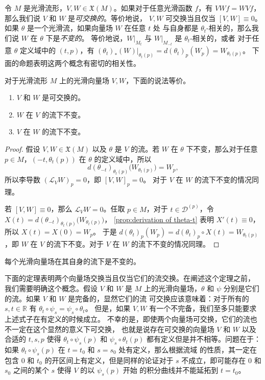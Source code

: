 令 $M$ 是光滑流形，$V,W\in \mathfrak{X}(M)$。如果对于任意光滑函数 $f$，有 
$VWf=WVf$，那么我们说 $V$ 和 $W$ 是\emph{可交换的}。等价地说， $V,W$ 可交换当且仅当
$[V,W]\equiv 0$。如果 $\theta$ 是一个光滑流，如果向量场 $W$ 在任意 $t$ 处
与自身都是 $\theta_t$-相关的，那么我们说 $W$ 在 $\theta$ 下是\emph{不变的}。
等价地说，$W|_{M_t}$ 与 $W|_{M_{-t}}$ 是 $\theta_t$-相关的，或者
对于任意 $\theta$ 定义域中的 $(t,p)$，有 $(\theta_t)_*(W)|_{\theta_t(p)}=d (\theta_t)_{p}(W_p)=W_{\theta_t(p)}$。
下面的命题表明这两个概念有密切的相关性。

\begin{theorem}\label{thm:commuting vector fields}
  对于光滑流形 $M$ 上的光滑向量场 $V,W$，下面的说法等价。
  \begin{enumerate}
    \item $V$ 和 $W$ 是可交换的。
    \item $W$ 在 $V$ 的流下不变。
    \item $V$ 在 $W$ 的流下不变。
  \end{enumerate}
\end{theorem}
\begin{proof}
  假设 $V,W\in \mathfrak{X}(M)$ 以及 $\theta$ 是 $V$ 的流。若 $W$ 在 $\theta$
  下不变，那么对于任意 $p\in M$，$(-t,\theta_t(p))$ 在 $\theta$ 的定义域中，所以
  \[
    d(\theta_{-t})_{\theta_t(p)}\bigl(W_{\theta_t(p)}\bigr)=W_{p},
  \]
  所以李导数 $(\mathcal{L}_VW)_p=0$，即 $[V,W]_p=0$。
  对于 $V$ 在 $W$ 的流下不变的情况同理。

  若 $[V,W]\equiv 0$，那么 $\mathcal{L}_VW=0$。任取 $p\in M$，对于
  $t\in \mathcal{D}^{(p)}$，令 $X(t)=d(\theta_{-t})_{\theta_t(p)}\bigl(W_{\theta_t(p)}\bigr)$，
  \autoref{prop:derivation of theta-t} 表明 $X'(t)\equiv 0$，所以 $X(t)=X(0)=W_p$。
  于是 $d(\theta_t)_p(W_p)=d(\theta_t)_p\circ X(t)=W_{\theta_t(p)}$，即 $W$
  在 $V$ 的流下不变。对于 $V$ 在 $W$ 的流下不变的情况同理。
\end{proof}

\begin{corollary}
  每个光滑向量场在其自身的流下是不变的。
\end{corollary}

下面的定理表明两个向量场交换当且仅当它们的流交换。在阐述这个定理之前，
我们需要明确这个概念。假设 $V$ 和 $W$ 是 $M$ 上的光滑向量场，$\theta$
和 $\psi$ 分别是它们的流。如果 $V$ 和 $W$ 是完备的，显然它们的流
可交换应该意味着：对于所有的 $s,t\in \mathbb{R}$ 有 $\theta_t\circ\psi_s=\psi_s\circ\theta_t$。
但是，如果 $V,W$ 有一个不完备，我们至多只能要求上述式子在有定义的时候成立。
不幸的是，即使两个向量场可交换，它们的流也不一定在这个显然的意义下可交换，
也就是说存在可交换的向量场 $V$ 和 $W$ 以及合适的 $t,s,p$ 使得 $\theta_t\circ\psi_s(p)$ 
和 $\psi_s\circ\theta_t(p)$ 都有定义但是并不相等。问题在于：
如果 $\theta_t\circ\psi_s(p)$ 在 $t=t_0$ 和 $s=s_0$ 处有定义，那么根据流域
的性质，其一定在包含 $0$ 和 $t_0$ 的开区间上有定义，但是同样的论证对于 $s$
不成立，即可能存在 $0$ 和 $s_0$ 之间的某个 $s$ 使得 $V$ 的以 $\psi_s(p)$ 开始
的积分曲线并不能延拓到 $t=t_0$。

